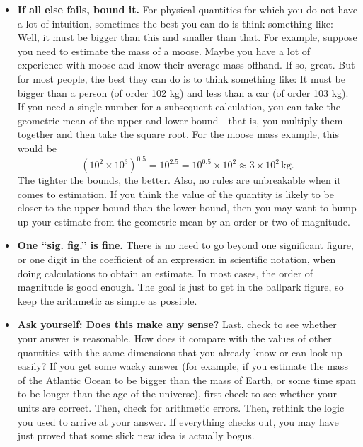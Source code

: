\documentclass{report}
\begin{document}
\begin{itemize}
        \item \textbf{If all else fails, bound it.} For physical quantities for which you do not have a lot of intuition, sometimes the best you can do is think something like: Well, it must be bigger than this and smaller than that. For example, suppose you need to estimate the mass of a moose. Maybe you have a lot of experience with moose and know their average mass offhand. If so, great. But for most people, the best they can do is to think something like: It must be bigger than a person (of order 102 kg) and less than a car (of order 103 kg). If you need a single number for a subsequent calculation, you can take the geometric mean of the upper and lower bound—that is, you multiply them together and then take the square root. For the moose mass example, this would be
            \[
                (10^2 \times 10^3)^{0.5} = 10^{2.5} = 10^{0.5} \times 10^2 \approx 3 \times 10^2 \, \text{kg}.
            \]
        The tighter the bounds, the better. Also, no rules are unbreakable when it comes to estimation. If you think the value of the quantity is likely to be closer to the upper bound than the lower bound, then you may want to bump up your estimate from the geometric mean by an order or two of magnitude.
        \item \textbf{One “sig. fig.” is fine.} There is no need to go beyond one significant figure, or one digit in the coefficient of an expression in scientific notation, when doing calculations to obtain an estimate. In most cases, the order of magnitude is good enough. The goal is just to get in the ballpark figure, so keep the arithmetic as simple as possible.
        \item \textbf{Ask yourself: Does this make any sense?} Last, check to see whether your answer is reasonable. How does it compare with the values of other quantities with the same dimensions that you already know or can look up easily? If you get some wacky answer (for example, if you estimate the mass of the Atlantic Ocean to be bigger than the mass of Earth, or some time span to be longer than the age of the universe), first check to see whether your units are correct. Then, check for arithmetic errors. Then, rethink the logic you used to arrive at your answer. If everything checks out, you may have just proved that some slick new idea is actually bogus.
    \end{itemize}
    \bigbreak \noindent 
\end{document}
